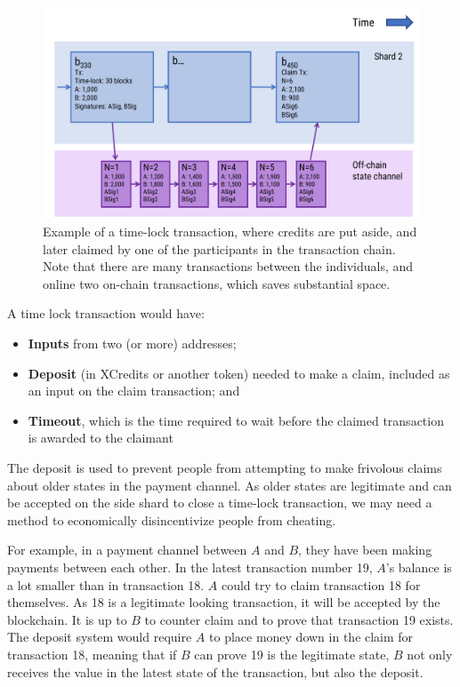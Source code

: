 \documentclass[a4paper,12pt]{article}
\begin{document}
\begin{figure}[!htb]
  \centering
  \includegraphics[page=1,width=.95\textwidth]{time-lock} 
  \caption{Example of a time-lock transaction, where credits are put aside, and later claimed by one of the participants in the transaction chain. Note that there are many transactions between the individuals, and online two on-chain transactions, which saves substantial space.}
  \label{fig:time-lock}
\end{figure}
\FloatBarrier

A time lock transaction would have:
\begin{itemize}
  \item \textbf{Inputs} from two (or more) addresses;
  \item \textbf{Deposit }(in XCredits or another token) needed to make a claim, included as an input on the claim transaction; and
  \item \textbf{Timeout}, which is the time required to wait before the claimed transaction is awarded to the claimant
\end{itemize}

The deposit is used to prevent people from attempting to make frivolous claims about older states in the payment channel. As older states are legitimate and can be accepted on the side shard to close a time-lock transaction, we may need a method to economically disincentivize people from cheating. 

For example, in a payment channel between $A$ and $B$, they have been making payments between each other. In the latest transaction number 19, $A$'s balance is a lot smaller than in transaction 18. $A$ could try to claim transaction 18 for themselves. As 18 is a legitimate looking transaction, it will be accepted by the blockchain. It is up to $B$ to counter claim and to prove that transaction 19 exists. The deposit system would require $A$ to place money down in the claim for transaction 18, meaning that if $B$ can prove 19 is the legitimate state, $B$ not only receives the value in the latest state of the transaction, but also the deposit. 
\end{document}
